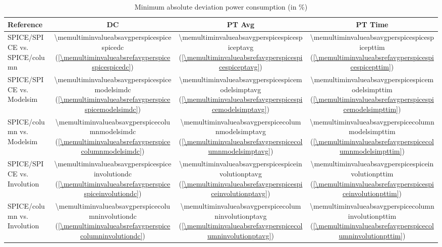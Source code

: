 \documentclass{article}
\begin{document}
\begin{table}[hbt]
\begin{tabular}{ l *{3}{|S[table-column-width=1.44cm]}} 
  {Reference} & {DC} & {PT Avg} & {PT Time} \\
  \hline			
  {SPICE/SPICE vs. SPICE/column} & 
  \num{\memultiminvalueabsavgperspicespicespicedc} 
  {(\ref{\memultiminvalueabsrefavgperspicespicespicedc})} & 
  \num{\memultiminvalueabsavgperspicespicespiceptavg} 
  {(\ref{\memultiminvalueabsrefavgperspicespicespiceptavg})} & 
  \num{\memultiminvalueabsavgperspicespicespicepttim} 
  {(\ref{\memultiminvalueabsrefavgperspicespicespicepttim})}\\
  \hline	
  {SPICE/SPICE vs. Modelsim} & 
  \num{\memultiminvalueabsavgperspicespicemodelsimdc} 
  {(\ref{\memultiminvalueabsrefavgperspicespicemodelsimdc})}& 
  \num{\memultiminvalueabsavgperspicespicemodelsimptavg} 
  {(\ref{\memultiminvalueabsrefavgperspicespicemodelsimptavg})}& 
  \num{\memultiminvalueabsavgperspicespicemodelsimpttim} 
  {(\ref{\memultiminvalueabsrefavgperspicespicemodelsimpttim})}\\
  {SPICE/column vs. Modelsim} & \num{\memultiminvalueabsavgperspicecolumnmodelsimdc} {(\ref{\memultiminvalueabsrefavgperspicecolumnmodelsimdc})}& \num{\memultiminvalueabsavgperspicecolumnmodelsimptavg} {(\ref{\memultiminvalueabsrefavgperspicecolumnmodelsimptavg})}& \num{\memultiminvalueabsavgperspicecolumnmodelsimpttim} {(\ref{\memultiminvalueabsrefavgperspicecolumnmodelsimpttim})}\\
  \hline	
  {SPICE/SPICE vs. Involution} & 
  \num{\memultiminvalueabsavgperspicespiceinvolutiondc} 
  {(\ref{\memultiminvalueabsrefavgperspicespiceinvolutiondc})}& 
  \num{\memultiminvalueabsavgperspicespiceinvolutionptavg} 
  {(\ref{\memultiminvalueabsrefavgperspicespiceinvolutionptavg})}& 
  \num{\memultiminvalueabsavgperspicespiceinvolutionpttim} 
  {(\ref{\memultiminvalueabsrefavgperspicespiceinvolutionpttim})}\\
  {SPICE/column vs. Involution} & \num{\memultiminvalueabsavgperspicecolumninvolutiondc} {(\ref{\memultiminvalueabsrefavgperspicecolumninvolutiondc})}& \num{\memultiminvalueabsavgperspicecolumninvolutionptavg} {(\ref{\memultiminvalueabsrefavgperspicecolumninvolutionptavg})}& \num{\memultiminvalueabsavgperspicecolumninvolutionpttim} {(\ref{\memultiminvalueabsrefavgperspicecolumninvolutionpttim})}\\
  \hline	
\end{tabular}
\caption{Minimum absolute deviation power consumption (in \si{\percent})}
\end{table}
\end{document}
